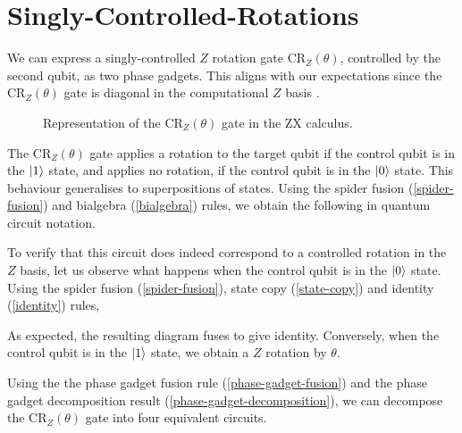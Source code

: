\section{Singly-Controlled-Rotations}%
\label{singly-controlled-rotations}

We can express a singly-controlled $Z$ rotation gate CR$_Z(\theta)$, controlled by the second qubit, as two phase gadgets. This aligns with our expectations since the CR$_Z(\theta)$ gate is diagonal in the computational $Z$ basis \cite{Yeung2020}.

\begin{figure}[H]
    \centering
    \caption{Representation of the CR$_Z(\theta)$ gate in the ZX calculus.}
    \label{crz}
\end{figure}

The CR$_Z(\theta)$ gate applies a rotation to the target qubit if the control qubit is in the $\ket 1$ state, and applies no rotation, if the control qubit is in the $\ket 0$ state. This behaviour generalises to superpositions of states. Using the spider fusion (\ref{spider-fusion}) and bialgebra (\ref{bialgebra}) rules, we obtain the following in quantum circuit notation.


To verify that this circuit does indeed correspond to a controlled rotation in the $Z$ basis, let us observe what happens when the control qubit is in the $\ket 0$ state. Using the spider fusion (\ref{spider-fusion}), state copy (\ref{state-copy}) and identity (\ref{identity}) rules,


As expected, the resulting diagram fuses to give identity. Conversely, when the control qubit is in the $\ket 1$ state, we obtain a $Z$ rotation by $\theta$.


Using the the phase gadget fusion rule (\ref{phase-gadget-fusion}) and the phase gadget decomposition result (\ref{phase-gadget-decomposition}), we can decompose the CR$_Z(\theta)$ gate into four equivalent circuits.

